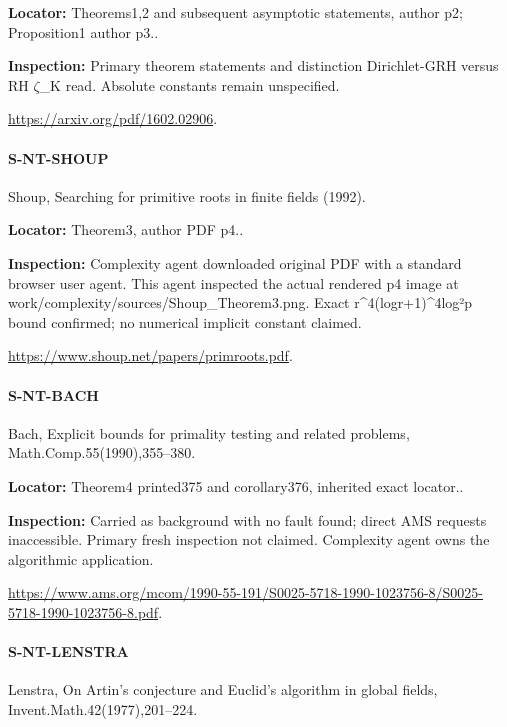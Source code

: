\documentclass[11pt,a4paper]{article}
\begin{document}
\textbf{Locator:} Theorems1,2 and subsequent asymptotic statements, author p2; Proposition1 author p3.\allowbreak{}.

\textbf{Inspection:} Primary theorem statements and distinction Dirichlet-GRH versus RH \ensuremath{\zeta}\_\allowbreak{}K read.\allowbreak{} Absolute constants remain unspecified.\allowbreak{}

\url{https://arxiv.org/pdf/1602.02906}.

\paragraph{S-NT-SHOUP} Shoup, Searching for primitive roots in finite fields (1992).

\textbf{Locator:} Theorem3, author PDF p4.\allowbreak{}.

\textbf{Inspection:} Complexity agent downloaded original PDF with a standard browser user agent.\allowbreak{} This agent inspected the actual rendered p4 image at work/\allowbreak{}complexity/\allowbreak{}sources/\allowbreak{}Shoup\_\allowbreak{}Theorem3.\allowbreak{}png.\allowbreak{} Exact r\textasciicircum{}4(logr+1)\textasciicircum{}4log²p bound confirmed; no numerical implicit constant claimed.\allowbreak{}

\url{https://www.shoup.net/papers/primroots.pdf}.

\paragraph{S-NT-BACH} Bach, Explicit bounds for primality testing and related problems, Math.\allowbreak{}Comp.\allowbreak{}55(1990),355–\allowbreak{}380.

\textbf{Locator:} Theorem4 printed375 and corollary376, inherited exact locator.\allowbreak{}.

\textbf{Inspection:} Carried as background with no fault found; direct AMS requests inaccessible.\allowbreak{} Primary fresh inspection not claimed.\allowbreak{} Complexity agent owns the algorithmic application.\allowbreak{}

\url{https://www.ams.org/mcom/1990-55-191/S0025-5718-1990-1023756-8/S0025-5718-1990-1023756-8.pdf}.

\paragraph{S-NT-LENSTRA} Lenstra, On Artin’s conjecture and Euclid’s algorithm in global fields, Invent.\allowbreak{}Math.\allowbreak{}42(1977),201–\allowbreak{}224.
\end{document}
